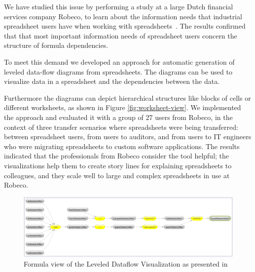 \documentclass[conference]{IEEEtran}
\begin{document}
We have studied this issue by performing a study at a large Dutch financial services company Robeco, to learn about the information needs that industrial spreadsheet users have when working with spreadsheets~\cite{hermans_supporting_2011}. The results confirmed that that most important information needs of spreadsheet users concern the structure of formula dependencies.

To meet this demand we developed an approach for automatic generation of leveled data-flow diagrams from spreadsheets. The diagrams can be used to visualize data in a spreadsheet and the dependencies between the data. 

Furthermore the diagrams can depict hierarchical structures like blocks of cells or different worksheets, as shown in Figure \ref{fig:worksheet-view}. We implemented the approach and evaluated it with a group of 27 users from Robeco, in the context of three transfer scenarios where spreadsheets were being transferred: between spreadsheet users, from users to auditors, and from users to IT engineers who were migrating spreadsheets to custom software applications. The results indicated that the professionals from Robeco consider the tool helpful; the visualizations help them to create story lines for explaining spreadsheets to colleagues, and they scale well to large and complex spreadsheets in use at Robeco. 

\begin{figure}
  \begin{center}
  \includegraphics[width=\columnwidth]{fig/formula-view.png}
  \caption{Formula view of the Leveled Dataflow Visualization as presented in \cite{hermans_supporting_2011}}
  \label{fig:formula-view}
  \end{center}
\end{figure} 
\end{document}
